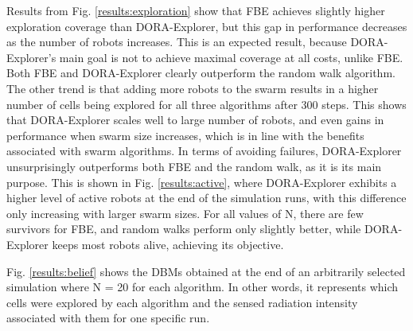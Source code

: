Results from Fig. \ref{results:exploration} show that FBE
achieves slightly higher exploration coverage than DORA-Explorer, but this
gap in performance decreases as the number of robots increases. This
is an expected result, because DORA-Explorer's main goal is not to achieve
maximal coverage at all costs, unlike FBE. Both FBE and DORA-Explorer clearly
outperform the random walk algorithm. The other trend is that adding
more robots to the swarm results in a higher
number of cells being explored for all three algorithms after 300
steps. This shows that DORA-Explorer scales well to large number of robots, and even gains in performance when swarm size increases, which is in line
with the benefits associated with swarm algorithms. In terms of avoiding failures, DORA-Explorer unsurprisingly outperforms both
FBE and the random walk, as it is its main purpose. This is shown in
Fig. \ref{results:active}, where DORA-Explorer exhibits a higher level of active
robots at the end of the simulation runs, with this difference only increasing with larger
swarm sizes. For all values of N, there are few
survivors for FBE, and random walks perform only slightly better, while DORA-Explorer keeps most robots alive, achieving its objective.


Fig. \ref{results:belief} shows the DBMs obtained at the end of an
arbitrarily selected simulation where N = 20 for each algorithm.  In
other words, it represents which cells were explored by each algorithm
and the sensed radiation intensity associated with them for one specific run. 

